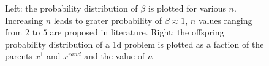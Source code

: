 \begin{itemize}
\begin{figure}[h!]
\begin{minipage}[b]{0.5\linewidth}
 \centering
\end{minipage}
\begin{minipage}[b]{0.5\linewidth}
 \centering
\end{minipage}
\caption{Left: the probability distribution of $\beta$ is plotted for various $n$. Increasing $n$ leads to grater probability of $\beta \approx 1$, $n$ values ranging from $2$ to $5$ are proposed in literature. Right: the offspring probability distribution of a 1d problem is plotted as a faction of the parents $x^1$ and $x^{rand}$ and the value of $n$ }
\label{sbx}
\end{figure}


\end{itemize}
